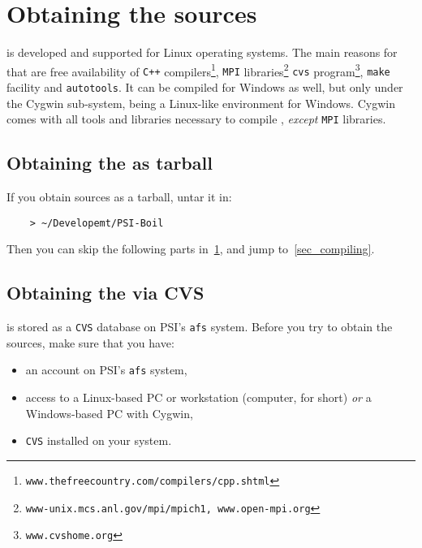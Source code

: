 \section{Obtaining the sources}
\label{sec_obtaining}

{\psiboil} is developed and supported for Linux operating systems.
The main reasons for that are free availability of {\tt C++} 
compilers\footnote{\tt www.thefreecountry.com/compilers/cpp.shtml},
{\tt MPI} libraries\footnote{\tt www-unix.mcs.anl.gov/mpi/mpich1, 
www.open-mpi.org}
{\tt cvs} program\footnote{\tt www.cvshome.org}, 
{\tt make} facility and {\tt autotools}.
It can be compiled for Windows as well, but only under the Cygwin sub-system,
being a Linux-like environment for Windows. Cygwin comes with all tools and
libraries necessary to compile {\psiboil}, {\em except} {\tt MPI} libraries.

\subsection{Obtaining the {\psiboil} as tarball}

If you obtain {\psiboil} sources as a tarball, untar it in:

\begin{verbatim}
	> ~/Developemt/PSI-Boil
\end{verbatim}

Then you can skip the following parts in~\ref{sec_obtaining}, and jump to~\ref{sec_compiling}.

\subsection{Obtaining the {\psiboil} via CVS}

{\psiboil} is stored as a {\tt CVS} database on PSI's {\tt afs} system. Before you
try to obtain the sources, make sure that you have:

\begin{itemize}
  \item an account on PSI's {\tt afs} system,
  \item access to a Linux-based PC or workstation (computer,
        for short) {\em or} a Windows-based PC with Cygwin,
  \item {\tt CVS} installed on your system.
\end{itemize}

